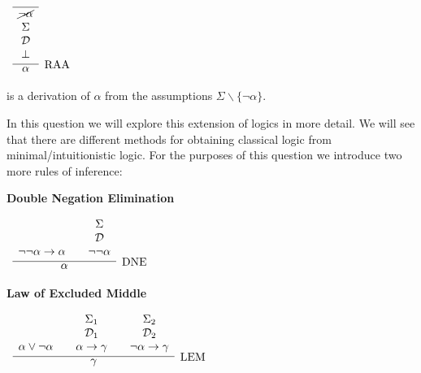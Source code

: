 \documentclass[11pt]{report}
\begin{document}
\begin{enumerate}
	\begin{center}		
		$\begin{array}{c}		
		\infer[\text{RAA}]{\alpha}
		{\begin{array}{c} \hline \cancel{\lnot\alpha} \\ \Sigma \\ \mathcal{D} \\ \bot \end{array}}
		\end{array}$
	\end{center}
	
	is a derivation of $\alpha$ from the assumptions $\Sigma \backslash\{\lnot\alpha\}$.

	In this question we will explore this extension of logics in more detail. We will see that there are different methods for obtaining classical logic from minimal/intuitionistic logic.	For the purposes of this question we introduce two more rules of inference: 

	\begin{center}
		\begin{minipage}{0.45\textwidth}
		\centering

			\textbf{Double Negation Elimination}

			$\begin{array}{ c }
			\infer[\text{DNE}]{\alpha}
			{
			\begin{array}{c} \  \\ \ \\ \lnot \lnot\alpha \to \alpha \end{array}
			& 
			\begin{array}{c} \Sigma  \\ \mathcal{D} \\ \lnot \lnot\alpha \end{array}							 
			}
			\end{array}$
		\end{minipage}%
	\hfill
		\begin{minipage}{0.45\textwidth}
		\centering

			\textbf{Law of Excluded Middle}

			$\begin{array}{ c }
			\infer[\text{LEM}]{\gamma}
			{
			\begin{array}{c} \  \\ \ \\ \alpha\lor\lnot\alpha \end{array}
			& 
			\begin{array}{c} \Sigma_{1}  \\ \mathcal{D}_{1} \\ \alpha\rightarrow\gamma \end{array}				
			& 
			\begin{array}{c} \Sigma_{2}  \\ \mathcal{D}_{2} \\ \lnot\alpha\rightarrow\gamma \end{array}				 
			}
			\end{array}$
		\end{minipage}
	\end{center}


\end{enumerate}
\end{document}
